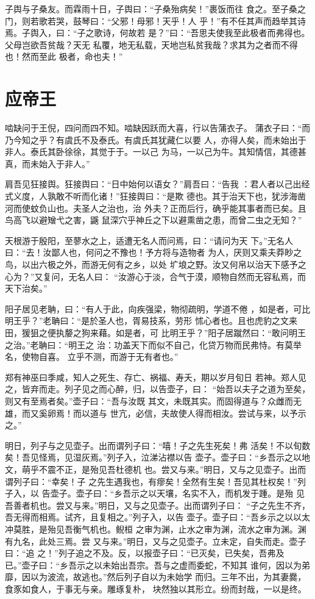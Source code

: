 \documentclass[a4paper,12pt,UTF8,twoside]{ctexbook}
\begin{document}
子舆与子桑友。而霖雨十日，子舆曰：“子桑殆病矣！”裹饭而往 食之。至子桑之门，则若歌若哭，鼓琴曰：“父邪！母邪！天乎！人 乎！”有不任其声而趋举其诗焉。子舆入，曰：“子之歌诗，何故若 是？”曰：“吾思夫使我至此极者而弗得也。父母岂欲吾贫哉？天无 私覆，地无私载，天地岂私贫我哉？求其为之者而不得也！然而至此 极者，命也夫！”

\section{应帝王}

啮缺问于王倪，四问而四不知。啮缺因跃而大喜，行以告蒲衣子。 蒲衣子曰：“而乃今知之乎？有虞氏不及泰氏。有虞氏其犹藏仁以要 人，亦得人矣，而未始出于非人。泰氏其卧徐徐，其觉于于。一以己 为马，一以己为牛。其知情信，其德甚真，而未始入于非人。”

肩吾见狂接舆。狂接舆曰：“日中始何以语女？”肩吾曰：“告我 ：君人者以己出经式义度，人孰敢不听而化诸！”狂接舆曰：“是欺 德也。其于治天下也，犹涉海凿河而使蚊负山也。夫圣人之治也，治 外夫？正而后行，确乎能其事者而已矣。且鸟高飞以避矰弋之害，鼷 鼠深穴乎神丘之下以避熏凿之患，而曾二虫之无知？”

天根游于殷阳，至蓼水之上，适遭无名人而问焉，曰：“请问为天 下。”无名人曰：“去！汝鄙人也，何问之不豫也！予方将与造物者 为人，厌则又乘夫莽眇之鸟，以出六极之外，而游无何有之乡，以处 圹埌之野。汝又何帛以治天下感予之心为？”又复问，无名人曰： “汝游心于淡，合气于漠，顺物自然而无容私焉，而天下治矣。”

阳子居见老聃，曰：“有人于此，向疾强梁，物彻疏明，学道不倦 ，如是者，可比明王乎？”老聃曰：“是於圣人也，胥易技系，劳形 怵心者也。且也虎豹之文来田，猨狙之便执嫠之狗来藉。如是者，可 比明王乎？”阳子居蹴然曰：“敢问明王之治。”老聃曰：“明王之 治：功盖天下而似不自己，化贷万物而民弗恃。有莫举名，使物自喜。 立乎不测，而游于无有者也。”

郑有神巫曰季咸，知人之死生、存亡、祸福、寿夭，期以岁月旬日 若神。郑人见之，皆弃而走。列子见之而心醉，归，以告壶子，曰： “始吾以夫子之道为至矣，则又有至焉者矣。”壶子曰：“吾与汝既 其文，未既其实。而固得道与？众雌而无雄，而又奚卵焉！而以道与 世亢，必信，夫故使人得而相汝。尝试与来，以予示之。”

明日，列子与之见壶子。出而谓列子曰：“嘻！子之先生死矣！弗 活矣！不以旬数矣！吾见怪焉，见湿灰焉。”列子入，泣涕沾襟以告 壶子。壶子曰：“乡吾示之以地文，萌乎不震不正，是殆见吾杜德机 也。尝又与来。”明日，又与之见壶子。出而谓列子曰：“幸矣！子 之先生遇我也，有瘳矣！全然有生矣！吾见其杜权矣！”列子入，以 告壶子。壶子曰：“乡吾示之以天壤，名实不入，而机发于踵。是殆 见吾善者机也。尝又与来。”明日，又与之见壶子。出而谓列子曰： “子之先生不齐，吾无得而相焉。试齐，且复相之。”列子入，以告 壶子。壶子曰：“吾乡示之以以太冲莫胜，是殆见吾衡气机也。鲵桓 之审为渊，止水之审为渊，流水之审为渊。渊有九名，此处三焉。尝 又与来。”明日，又与之见壶子。立未定，自失而走。壶子曰：“追 之！”列子追之不及。反，以报壶子曰：“已灭矣，已失矣，吾弗及 已。”壶子曰：“乡吾示之以未始出吾宗。吾与之虚而委蛇，不知其 谁何，因以为弟靡，因以为波流，故逃也。”然后列子自以为未始学 而归。三年不出，为其妻爨，食豕如食人，于事无与亲。雕琢复朴， 块然独以其形立。纷而封哉，一以是终。
\end{document}

